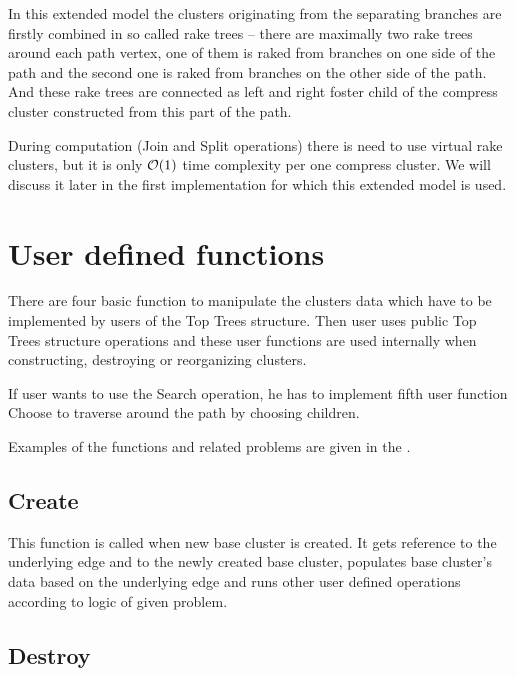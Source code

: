 In this extended model the clusters originating from the separating branches are
firstly combined in so called {\I rake trees} -- there are maximally two rake
trees around each path vertex, one of them is raked from branches on one side of
the path and the second one is raked from branches on the other side of the
path. And these rake trees are connected as left and right foster child of the
compress cluster constructed from this part of the path.


During computation ({\sc Join} and {\sc Split} operations) there is need to use
virtual rake clusters, but it is only ${\cal O}(1)$ time complexity per one compress
cluster. We will discuss it later in the first implementation for which this
extended model is used.



\section{User defined functions}

There are four basic function to manipulate the clusters data which have to
be implemented by users of the Top Trees structure. Then user uses public Top
Trees structure operations and these user functions are used internally when
constructing, destroying or reorganizing clusters.

If user wants to use the {\I Search} operation, he has to implement fifth user
function {\I Choose} to traverse around the path by choosing children.

Examples of the functions and related problems are given in the .

\subsection{Create}

This function is called when new base cluster is created. It gets reference to
the underlying edge and to the newly created base cluster, populates base
cluster's data based on the underlying edge and runs other user defined
operations according to logic of given problem.

\subsection{Destroy}

